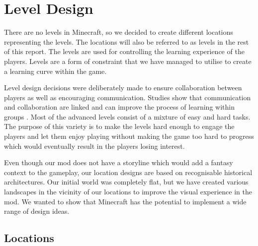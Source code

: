 \section{Level Design}
There are no levels in Minecraft, so we decided to create different locations representing the levels. The locations will also be referred to as levels in the rest of this report. The levels are used for controlling the learning experience of the players. Levels are a form of constraint that we have managed to utilise to create a learning curve within the game.

Level design decisions were deliberately made to ensure collaboration between players as well as encouraging communication. Studies show that communication and collaboration are linked and can improve the process of learning within groups \cite{boxtel00}.
Most of the advanced levels consist of a mixture of easy and hard tasks. The purpose of this variety is to make the levels hard enough to engage the players and let them enjoy playing without making the game too hard to progress which would eventually result in the players losing interest.

Even though our mod does not have a storyline which would add a fantasy context to the gameplay, our location designs are based on recognisable historical architectures. Our initial world was completely flat, but we have created various landscapes in the vicinity of our locations to improve the visual experience in the mod. We wanted to show that Minecraft has the potential to implement a wide range of design ideas.

\subsection{Locations}

